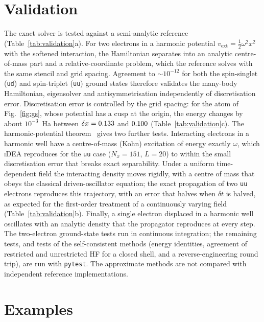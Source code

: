 \documentclass[5p,times,twocolumn]{elsarticle}
\newcommand{\iDEA}{\textsc{iDEA}}
\newcommand{\vext}{v_\mathrm{ext}}
\begin{document}
\section{Validation}



The exact solver is tested against a semi-analytic reference (Table~\ref{tab:validation}a). For two electrons in a harmonic potential $\vext=\tfrac12\omega^2x^2$ with the softened interaction, the Hamiltonian separates into an analytic centre-of-mass part and a relative-coordinate problem, which the reference solves with the same stencil and grid spacing. Agreement to $\sim\!10^{-12}$ for both the spin-singlet (\texttt{ud}) and spin-triplet (\texttt{uu}) ground states therefore validates the many-body Hamiltonian, eigensolver and antisymmetrisation independently of discretisation error.
Discretisation error is controlled by the grid spacing: for the atom of Fig.~\ref{fig:gs}, whose potential has a cusp at the origin, the energy changes by about $10^{-3}$~Ha between $\delta x=0.133$ and $0.100$ (Table~\ref{tab:validation}c).
The harmonic-potential theorem~\cite{Dobson1994} gives two further tests. Interacting electrons in a harmonic well have a centre-of-mass (Kohn) excitation of energy exactly $\omega$, which \iDEA{} reproduces for the \texttt{uu} case ($N_x=151$, $L=20$) to within the small discretisation error that breaks exact separability. Under a uniform time-dependent field the interacting density moves rigidly, with a centre of mass that obeys the classical driven-oscillator equation; the exact propagation of two \texttt{uu} electrons reproduces this trajectory, with an error that halves when $\delta t$ is halved, as expected for the first-order treatment of a continuously varying field (Table~\ref{tab:validation}b). Finally, a single electron displaced in a harmonic well oscillates with an analytic density that the propagator reproduces at every step. The two-electron ground-state tests run in continuous integration; the remaining tests, and tests of the self-consistent methods (energy identities, agreement of restricted and unrestricted HF for a closed shell, and a reverse-engineering round trip), are run with \texttt{pytest}. The approximate methods are not compared with independent reference implementations.

\section{Examples}
\end{document}
